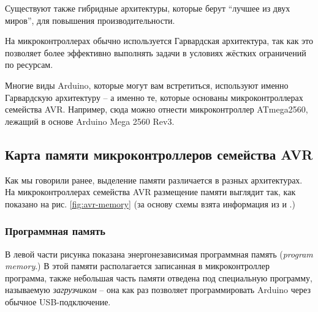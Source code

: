 \documentclass[../sparc.tex]{subfiles}
\begin{document}
Существуют также гибридные архитектуры, которые берут ``лучшее из двух миров'',
для повышения производительности.

На микроконтроллерах обычно используется Гарвардская архитектура, так как это
позволяет более эффективно выполнять задачи в условиях жёстких ограничений по
ресурсам.

Многие виды Arduino, которые могут вам встретиться, используют именно
Гарвардскую архитектуру -- а именно те, которые основаны микроконтроллерах
семейства AVR.  Например, сюда можно отнести микроконтроллер ATmega2560, лежащий
в основе Arduino Mega 2560 Rev3.\cite{arduino:memory-guide}

\subsection{Карта памяти микроконтроллеров семейства AVR}





Как мы говорили ранее, выделение памяти различается в разных архитектурах.  На
микроконтроллерах семейства AVR размещение памяти выглядит так, как показано на
рис. \ref{fig:avr-memory} (за основу схемы взята информация из
\cite{arduino:memory-guide} и \cite{avr:atmega328p-datasheet}.)

\subsubsection{Программная память}

В левой части рисунка показана энергонезависимая программная память
(\emph{program memory}.)  В этой памяти располагается записанная в
микроконтроллер программа, также небольшая часть памяти отведена под специальную
программу, называемую \emph{загрузчиком} -- она как раз позволяет программировать
Arduino через обычное USB-подключение.
\end{document}
